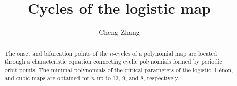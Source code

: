 \documentclass[preprint]{revtex4-1}
\begin{document}
\newcommand{\odd}{\mathrm{odd}}

\newcommand{\vct}[1]{\mathbf{#1}}




\newcommand{\vx}{\vct x}
\newcommand{\Bset}{\mathcal B}
\newcommand{\NB}{N_\Bset}
\newcommand{\RX}{(R, \lambda)}

\newcommand{\eq}{Eq.}
\newcommand{\eqs}{Eqs.}
\newcommand{\req}[1]{(\ref{eq:#1})}
\newcommand{\refeq}[1]{\eq\,\req{#1}}
\newcommand{\refeqs}[1]{\eqs\,\req{#1}}
\newcommand{\reqsub}[2]{(\ref{eq:#1}#2)}
\newcommand{\refeqsub}[2]{\eq\,\reqsub{#1}{#2}}
\newcommand{\refeqssub}[2]{\eqs\,\reqsub{#1}{#2}}

\newcommand{\refthm}[1]{Theorem \ref{thm:#1}}
\newcommand{\refthms}[1]{Theorems \ref{thm:#1}}
\newcommand{\refsec}[1]{Section \ref{sec:#1}}
\newcommand{\refsecs}[1]{Sections \ref{sec:#1}}
\newcommand{\refapd}[1]{Appendix \ref{apd:#1}}
\newcommand{\reftab}[1]{Table \ref{tab:#1}}
\newcommand{\reftabs}[1]{Tables \ref{tab:#1}}
\newcommand{\reffig}[1]{Fig. \ref{fig:#1}}
\newcommand{\reffigs}[1]{Figs. \ref{fig:#1}}

\newtheorem{theorem}{Theorem}
\newenvironment{remark}[1][1]%
{\par\noindent\textbf{Remark #1.} }{\medskip}






\title{Cycles of the logistic map}
\author{Cheng Zhang}

\begin{abstract}
%
The onset and bifurcation points of the $n$-cycles of
  a polynomial map are located
  through a characteristic equation
  connecting cyclic polynomials formed by periodic orbit points.
The minimal polynomials of the critical parameters
  of the logistic, H\'enon, and cubic maps are obtained
  for $n$ up to 13, 9, and 8,
  respectively.
%
\end{abstract}
\maketitle
\end{document}
